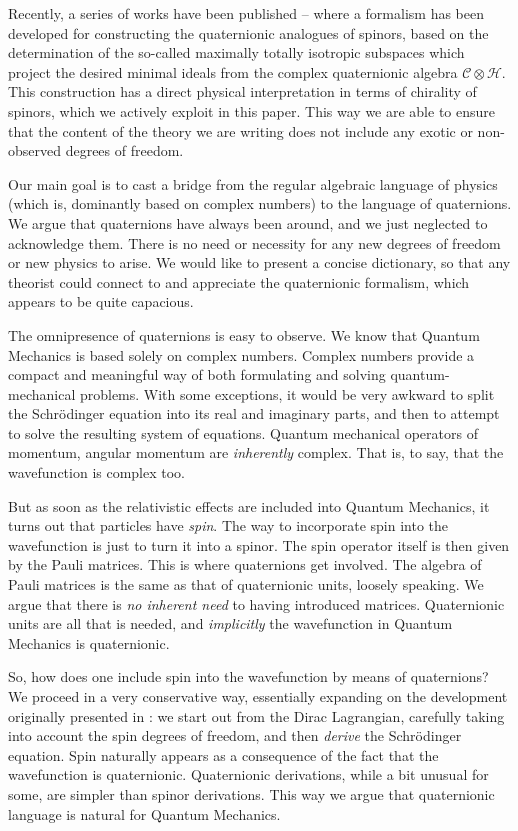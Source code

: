 \documentclass[epsfig,12pt]{article}
\newcommand{\cC}{\mathcal{C}}
\newcommand{\cH}{\mathcal{H}}
\begin{document}
	Recently, a series of works have been published \cite{Furey:2010fm}--\cite{Furey:2015tqa} where a formalism has been developed for constructing
	the quaternionic analogues of spinors, based on the determination of the so-called
	maximally totally isotropic subspaces which project the desired minimal ideals from the
	complex quaternionic algebra $ \cC \otimes \cH $.
	This construction has a direct physical interpretation in terms of chirality of spinors,
	which we actively exploit in this paper.
	This way we are able to ensure that the content of the theory we are writing does not
	include any exotic or non-observed degrees of freedom.

	Our main goal is to cast a bridge from the regular algebraic language of physics (which is, dominantly based
	on complex numbers) to the language of quaternions.
	We argue that quaternions have always been around, and we just neglected to acknowledge them.
	There is no need or necessity for any new degrees of freedom or new physics to arise.
	We would like to present a concise dictionary, so that any theorist could connect to and appreciate
	the quaternionic formalism, which appears to be quite capacious.

	The omnipresence of quaternions is easy to observe.
	We know that Quantum Mechanics is based solely on complex numbers.
	Complex numbers provide a compact and meaningful way of both formulating and solving quantum-mechanical problems.
	With some exceptions, it would be very awkward to split the Schr\"odinger equation into its real and imaginary parts,
	and then to attempt to solve the resulting system of equations.
	Quantum mechanical operators of momentum, angular momentum are \emph{inherently} complex.
	That is, to say, that the wavefunction is complex too.
	
	But as soon as the relativistic effects are included into Quantum Mechanics, it turns out that particles
	have \emph{spin}.
	The way to incorporate spin into the wavefunction is just to turn it into a spinor.
	The spin operator itself is then given by the Pauli matrices.
	This is where quaternions get involved.
	The algebra of Pauli matrices is the same as that of quaternionic units, loosely speaking.
	We argue that there is \emph{no inherent need} to having introduced matrices.
	Quaternionic units are all that is needed, and \emph{implicitly} the wavefunction in Quantum Mechanics is quaternionic.

	So, how does one include spin into the wavefunction by means of quaternions?
	We proceed in a very conservative way, essentially expanding on the development originally presented in \cite{thesis}:
	we start out from the Dirac Lagrangian, carefully taking into account the spin degrees of freedom,
	and then \emph{derive} the Schr\"odinger equation.
	Spin naturally appears as a consequence of the fact that the wavefunction is quaternionic.
	Quaternionic derivations, while a bit unusual for some, are simpler than spinor derivations.
	This way we argue that quaternionic language is natural for Quantum Mechanics.
\end{document}
